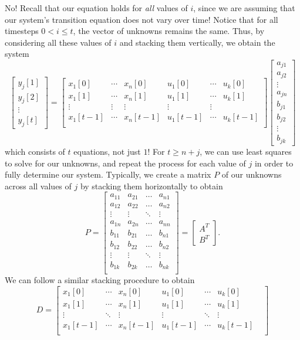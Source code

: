 \documentclass[letterpaper]{article}
\theoremstyle{remark}
\newcommand{\mat}[1]{\ensuremath{\begin{bmatrix}#1\end{bmatrix}}}
\begin{document}
No! Recall that our equation holds for \emph{all} values of $i$, since we are assuming that our system's transition equation does not vary over time! Notice that for all timesteps $0 < i \le t$, the vector of unknowns remains the same. Thus, by considering all these values of $i$ and stacking them vertically, we obtain the system
\[
    \mat{
        y_j[1] \\
        y_j[2] \\
        \vdots \\
        y_j[t]
    } = \mat{
        x_1[0] & \cdots & x_n[0] & u_1[0] & \cdots & u_k[0] \\
        x_1[1] & \cdots & x_n[1] & u_1[1] & \cdots & u_k[1] \\
        \vdots & \vdots & \vdots & \vdots & \vdots & \\
        x_1[t - 1] & \cdots & x_n[t - 1] & u_1[t - 1] & \cdots & u_k[t - 1] \\
    } \mat{a_{j1} \\ a_{j2} \\ \vdots \\ a_{jn} \\ b_{j1} \\ b_{j2} \\ \vdots \\ b_{jk}}
\]
which consists of $t$ equations, not just $1$! For $t \ge n + j$, we can use least squares to solve for our unknowns, and repeat the process for each value of $j$ in order to fully determine our system. Typically, we create a matrix $P$ of our unknowns across all values of $j$ by stacking them horizontally to obtain
\[
    P = \mat{
    a_{11} & a_{21} & \ldots & a_{n1} \\ 
    a_{12} & a_{22} & \ldots & a_{n2} \\ 
    \vdots & \vdots & \ddots & \vdots \\
    a_{1n} & a_{2n} & \ldots & a_{nn} \\ 
    b_{11} & b_{21} & \ldots & b_{n1} \\ 
    b_{12} & b_{22} & \ldots & b_{n2} \\ 
    \vdots & \vdots & \ddots & \vdots \\
    b_{1k} & b_{2k} & \ldots & b_{nk} \\
    } = \mat{A^T \\ B^T}.
\]
We can follow a similar stacking procedure to obtain
\[
    D = \mat{
        x_1[0] & \cdots & x_n[0] & u_1[0] & \cdots & u_k[0] \\
        x_1[1] & \cdots & x_n[1] & u_1[1] & \cdots & u_k[1] \\
        \vdots & \ddots & \vdots & \vdots & \ddots & \vdots & \\
        x_1[t - 1] & \cdots & x_n[t - 1] & u_1[t - 1] & \cdots & u_k[t - 1] \\
    }
\]
\end{document}
